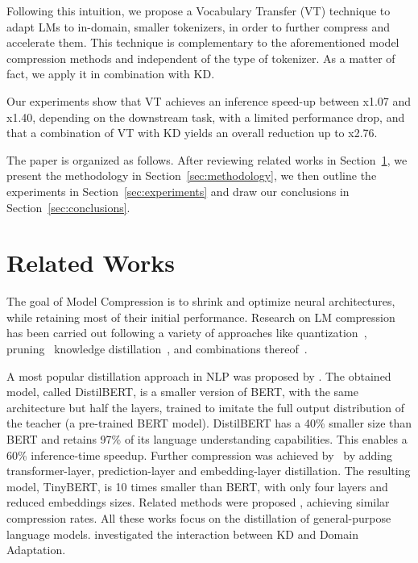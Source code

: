 \documentclass[11pt]{article}
\begin{document}
Following this intuition, we propose a Vocabulary Transfer (VT) technique to adapt LMs to in-domain, smaller tokenizers, in order to further compress and accelerate them. This technique is complementary to the aforementioned model compression methods and independent of the type of tokenizer. As a matter of fact, we apply it in combination with KD. 

Our experiments show that VT achieves an inference speed-up between x1.07 and x1.40, depending on the downstream task, with a limited  performance drop, and that a combination of VT with KD yields an overall reduction up to x2.76. 

The paper is organized as follows. After reviewing related works in Section~\ref{sec:relworks}, we present the methodology in Section~\ref{sec:methodology}, we then outline the experiments in Section~\ref{sec:experiments} and draw our conclusions in Section~\ref{sec:conclusions}. 

\section{Related Works}\label{sec:relworks}

The goal of Model Compression is to shrink and optimize neural architectures, while retaining most of their initial performance. Research on LM compression has been carried out following a variety of approaches like quantization~\cite{gupta2015deep,quantization}, pruning~\cite{prunenoprune,sixteenheads} knowledge distillation~\cite{distilbert,jiao2020tinybert,wang2020minilm}, and combinations thereof~\cite{polino2018model}.

A most popular distillation approach in NLP was proposed by \citet{distilbert}. The obtained model, called DistilBERT, is a smaller version of BERT, with the same architecture but half the layers,  trained to imitate the full output distribution of the teacher (a pre-trained BERT model). DistilBERT has a 40\% smaller size than BERT and retains 97\% of its language understanding capabilities. This enables a 60\% inference-time speedup. Further compression was achieved by~\citet{jiao2020tinybert} by adding transformer-layer, prediction-layer and embedding-layer distillation. The resulting model, TinyBERT, is 10 times smaller than BERT, with only four layers and reduced embeddings sizes. Related methods were proposed \cite{sun2020mobilebert,wang2020minilm}, achieving similar compression rates.
All these works focus on the distillation of general-purpose language models.  \citet{gordon-duh-2020-distill}  investigated the interaction between KD and Domain Adaptation.
\end{document}
